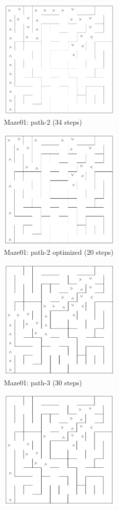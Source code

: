 \documentclass[11pt, oneside]{article}   	%
\begin{document}
\begin{figure}
\begin{subfigure}{7cm}
  \centering
  \includegraphics[width=6cm]{maze-01-2nd.png}
  \caption{Maze01: path-2 (34 steps)}
  \label{fig:path-2}
\end{subfigure}
\begin{subfigure}{7cm}
  \centering
  \includegraphics[width=6cm]{maze-01-2nd-star.png}
  \caption{Maze01: path-2 optimized (20 steps)}
  \label{fig:path-2-optimized}
\end{subfigure}
\begin{subfigure}{7cm}
  \centering
  \includegraphics[width=6cm]{maze-01-3rd.png}
  \caption{Maze01: path-3 (30 steps)}
  \label{fig:path-3}
\end{subfigure}
\begin{subfigure}{7cm}
  \centering
  \includegraphics[width=6cm]{maze-01-3rd-star.png}

\end{subfigure}
\end{figure}
\end{document}
